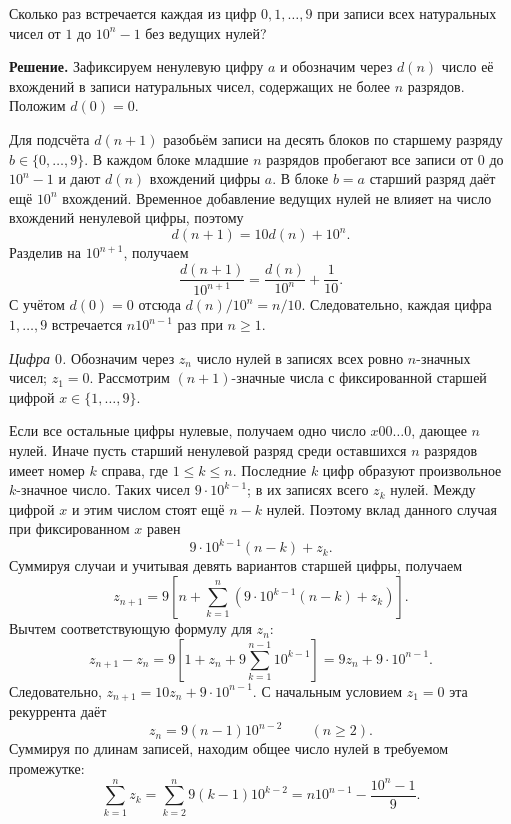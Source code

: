 \begin{problems}
\item Сколько раз встречается каждая из цифр $0,1,\ldots,9$ при записи всех натуральных чисел от $1$ до $10^n-1$ без ведущих нулей?
\par\smallskip\noindent\textbf{Решение.} Зафиксируем ненулевую цифру $a$ и обозначим через $d(n)$ число её вхождений в записи натуральных чисел, содержащих не более $n$ разрядов. Положим $d(0)=0$.
\par Для подсчёта $d(n+1)$ разобьём записи на десять блоков по старшему разряду $b\in\{0,\ldots,9\}$. В каждом блоке младшие $n$ разрядов пробегают все записи от $0$ до $10^n-1$ и дают $d(n)$ вхождений цифры $a$. В блоке $b=a$ старший разряд даёт ещё $10^n$ вхождений. Временное добавление ведущих нулей не влияет на число вхождений ненулевой цифры, поэтому
\[
d(n+1)=10d(n)+10^n.
\]
Разделив на $10^{n+1}$, получаем
\[
\frac{d(n+1)}{10^{n+1}}=\frac{d(n)}{10^n}+\frac1{10}.
\]
С учётом $d(0)=0$ отсюда $d(n)/10^n=n/10$. Следовательно, каждая цифра $1,\ldots,9$ встречается $n10^{n-1}$ раз при $n\ge1$.
\par\textit{Цифра $0$.} Обозначим через $z_n$ число нулей в записях всех ровно $n$-значных чисел; $z_1=0$. Рассмотрим $(n+1)$-значные числа с фиксированной старшей цифрой $x\in\{1,\ldots,9\}$.
\par Если все остальные цифры нулевые, получаем одно число $x00\ldots0$, дающее $n$ нулей. Иначе пусть старший ненулевой разряд среди оставшихся $n$ разрядов имеет номер $k$ справа, где $1\le k\le n$. Последние $k$ цифр образуют произвольное $k$-значное число. Таких чисел $9\cdot10^{k-1}$; в их записях всего $z_k$ нулей. Между цифрой $x$ и этим числом стоят ещё $n-k$ нулей. Поэтому вклад данного случая при фиксированном $x$ равен
\[
9\cdot10^{k-1}(n-k)+z_k.
\]
Суммируя случаи и учитывая девять вариантов старшей цифры, получаем
\[
z_{n+1}=9\left[n+\sum_{k=1}^{n}\left(9\cdot10^{k-1}(n-k)+z_k\right)\right].
\]
Вычтем соответствующую формулу для $z_n$:
\[
z_{n+1}-z_n
=9\left[1+z_n+9\sum_{k=1}^{n-1}10^{k-1}\right]
=9z_n+9\cdot10^{n-1}.
\]
Следовательно, $z_{n+1}=10z_n+9\cdot10^{n-1}$. С начальным условием $z_1=0$ эта рекуррента даёт
\[
z_n=9(n-1)10^{n-2}\qquad(n\ge2).
\]
Суммируя по длинам записей, находим общее число нулей в требуемом промежутке:
\[
\sum_{k=1}^{n}z_k
=\sum_{k=2}^{n}9(k-1)10^{k-2}
=n10^{n-1}-\frac{10^n-1}{9}.
\]\par


\end{problems}
